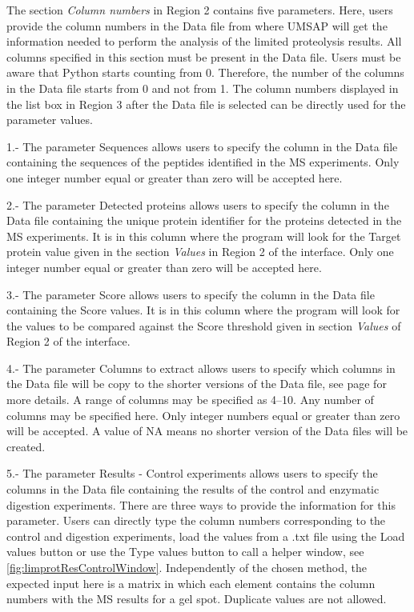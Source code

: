 The section \textit{Column numbers} in Region \num{2} contains five parameters. Here, users provide the column numbers in the Data file from where UMSAP will get the information needed to perform the analysis of the limited proteolysis results. All columns specified  in this section must be present in the Data file. Users must be aware that Python starts counting from \num{0}. Therefore, the number of the columns in the Data file starts from \num{0} and not from \num{1}. The column numbers displayed in the list box in Region \num{3} after the Data file is selected can be directly used for the parameter values.  

\num{1}.- The parameter Sequences allows users to specify the column in the Data file containing the sequences of the peptides identified in the MS experiments. Only one integer number equal or greater than zero will be accepted here.

\num{2}.- The parameter Detected proteins allows users to specify the column in the Data file containing the unique protein identifier for the proteins detected in the MS experiments. It is in this column where the program will look for the Target protein value given in the section \textit{Values} in Region \num{2} of the interface. Only one integer number equal or greater than zero will be accepted here.

\num{3}.- The parameter Score allows users to specify the column in the Data file containing the Score values. It is in this column where the program will look for the values to be compared against the Score threshold given in section \textit{Values} of Region \num{2} of the interface.

\num{4}.- The parameter Columns to extract\label{par:limprotColumnExtract} allows users to specify which columns in the Data file will be copy to the shorter versions of the Data file, see page \pageref{par:UtilColumnExtract} for more details. A range of columns may be specified as \numrange[range-phrase = --]{4}{10}. Any number of columns may be specified here. Only integer numbers equal or greater than zero will be accepted. A value of NA means no shorter version of the Data files will be created.

\num{5}.- \label{par:limprotResultControl}The parameter Results - Control experiments allows users to specify the columns in the Data file containing the results of the control and enzymatic digestion experiments. There are three ways to provide the information for this parameter. Users can directly type the column numbers corresponding to the control and digestion experiments, load the values from a .txt file using the Load values button or use the Type values button to call a helper window, see \autoref{fig:limprotResControlWindow}. Independently of the chosen method, the expected input here is a matrix in which each element contains the column numbers with the MS results for a gel spot. Duplicate values are not allowed. 

